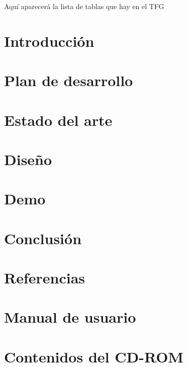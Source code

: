 \documentclass[openright,twoside,10pt]{book}
\begin{document}
Aquí aparecerá la lista de tablas que hay en el TFG

\chapter{Introducción}\label{cap.introduccion}


\chapter{Plan de desarrollo}\label{cap.plandes}


\chapter{Estado del arte}\label{cap.arte}


\chapter{Diseño}
\label{cap.desarrollo}


\chapter{Demo}\label{cap.demo}


\chapter{Conclusión}\label{cap.conclusion}


\chapter{Referencias}\label{cap.referencias}



\appendix

\chapter{Manual de usuario}\label{aped.A}

\chapter{Contenidos del CD-ROM}\label{aped.B}

\end{document}
